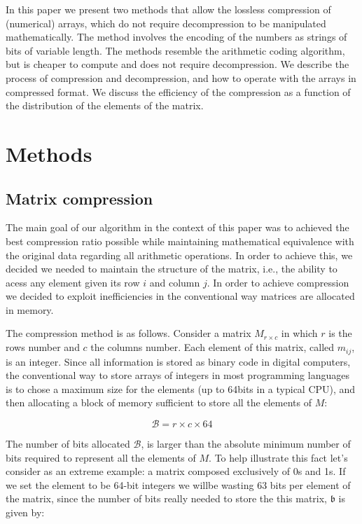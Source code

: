 \documentclass[10pt]{article}
\begin{document}
In this paper we present two methods that allow the lossless compression of (numerical) arrays, which do not require decompression to be manipulated mathematically. The method involves the encoding of the numbers as strings of bits of variable length. The methods resemble the arithmetic coding\cite{bodden2007arithmetic} algorithm, but is cheaper to compute and does not require decompression. We describe the process of compression and decompression, and how to operate with the arrays in compressed format. We discuss the efficiency of the compression as a function of the distribution of the elements of the matrix. 

\section*{Methods}

\subsection*{Matrix compression}

The main goal of our algorithm in the context of this paper was to achieved the best compression ratio possible while maintaining mathematical equivalence with the original data regarding all arithmetic operations. In order to achieve this, we decided we needed to maintain the structure of the matrix, i.e., the ability to acess any element given its row $i$ and column $j$. In order to achieve compression we decided to exploit inefficiencies in the conventional way matrices are allocated in memory.

The compression method is as follows. Consider a matrix $M_{r \times c}$ in which $r$ is the rows number and $c$ the columns number. Each element of this matrix, called $m_{ij}$, is an integer. Since all information is stored as binary code in digital computers, the conventional way to store arrays of integers in most programming languages is to chose a maximum size for the elements (up to 64bits in a typical CPU), and then allocating a block of memory sufficient to store all the elements of $M$:


\begin{equation}\label{eq:01}
  \mathcal{B} = r \times c \times 64
\end{equation}

The number of bits allocated $\mathcal{B}$, is larger than the absolute minimum number of bits required to represent all the elements of $M$. To help illustrate this fact let's consider as an extreme example: a matrix composed exclusively of 0s and 1s. If we set the element to be 64-bit integers we willbe wasting 63 bits per element of the matrix, since the number of bits really needed to store the this matrix, $\mathfrak{b}$ is given by:
\end{document}
